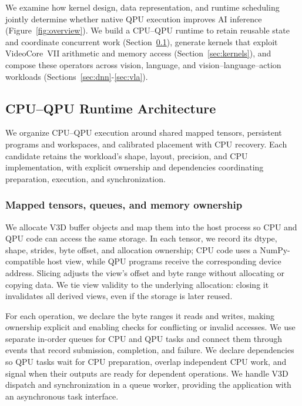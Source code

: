 \documentclass[sigplan,screen,review]{acmart}
\begin{document}
We examine how kernel design, data representation, and runtime scheduling jointly determine whether native QPU execution improves AI inference (Figure~\ref{fig:overview}). We build a CPU--QPU runtime to retain reusable state and coordinate concurrent work (Section~\ref{sec:arch}), generate kernels that exploit VideoCore~VII arithmetic and memory access (Section~\ref{sec:kernels}), and compose these operators across vision, language, and vision--language--action workloads (Sections~\ref{sec:dnn}-\ref{sec:vla}). 


\subsection{CPU–QPU Runtime Architecture}
\label{sec:arch}

We organize CPU--QPU execution around shared mapped tensors, persistent programs and workspaces, and calibrated placement with CPU recovery. Each candidate retains the workload's shape, layout, precision, and CPU implementation, with explicit ownership and dependencies coordinating preparation, execution, and synchronization.

\subsubsection{Mapped tensors, queues, and memory ownership}

We allocate V3D buffer objects and map them into the host process so CPU and QPU code can access the same storage. In each tensor, we record its dtype, shape, strides, byte offset, and allocation ownership; CPU code uses a NumPy-compatible host view, while QPU programs receive the corresponding device address. Slicing adjusts the view's offset and byte range without allocating or copying data. We tie view validity to the underlying allocation: closing it invalidates all derived views, even if the storage is later reused. 

For each operation, we declare the byte ranges it reads and writes, making ownership explicit and enabling checks for conflicting or invalid accesses. We use separate in-order queues for CPU and QPU tasks and connect them through events that record submission, completion, and failure. We declare dependencies so QPU tasks wait for CPU preparation, overlap independent CPU work, and signal when their outputs are ready for dependent operations. We handle V3D dispatch and synchronization in a queue worker, providing the application with an asynchronous task interface.
\end{document}
